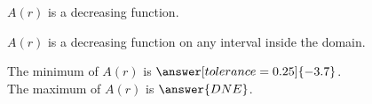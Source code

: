 \documentclass{ximera}
\begin{document}
\begin{exercise}
\begin{question}
$A(r)$ is a decreasing function.
\begin{multipleChoice}
\end{multipleChoice}

\end{question}







\begin{question} 



$A(r)$ is a decreasing function on any interval inside the domain.
\begin{multipleChoice}
\end{multipleChoice}

\end{question}






\begin{question} 



The minimum of $A(r)$ is $\answer[tolerance=0.25]{-3.7}$.   \\

The maximum of $A(r)$ is $\answer{DNE}$.
 

\end{question}












\end{exercise}
\end{document}
